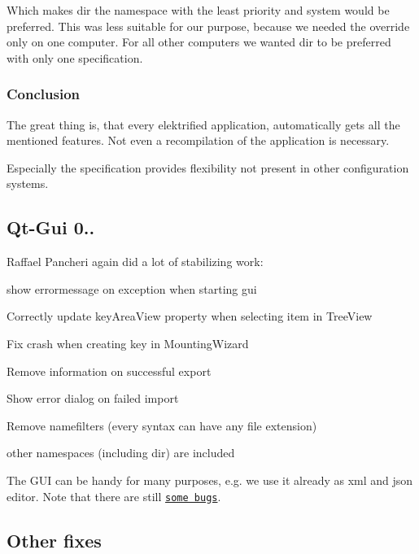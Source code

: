 Which makes dir the namespace with the least priority and system would be preferred. This was less suitable for our purpose, because we needed the override only on one computer. For all other computers we wanted dir to be preferred with only one specification.

\subsubsection*{Conclusion}

The great thing is, that every elektrified application, automatically gets all the mentioned features. Not even a recompilation of the application is necessary.

Especially the specification provides flexibility not present in other configuration systems.

\subsection*{Qt-\/\+Gui 0..}

Raffael Pancheri again did a lot of stabilizing work\+:
\begin{DoxyItemize}
\item show errormessage on exception when starting gui
\item Correctly update key\+Area\+View property when selecting item in Tree\+View
\item Fix crash when creating key in Mounting\+Wizard
\item Remove information on successful export
\item Show error dialog on failed import
\item Remove namefilters (every syntax can have any file extension)
\item other namespaces (including dir) are included
\end{DoxyItemize}

The G\+U\+I can be handy for many purposes, e.\+g. we use it already as xml and json editor. Note that there are still \href{http://git.libelektra.org/issues}{\tt some bugs}.

\subsection*{Other fixes}


